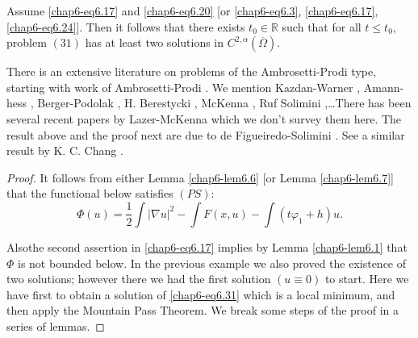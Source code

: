 \begin{theorem}\label{chap6-thm6.10}
Assume \eqref{chap6-eq6.17} and \eqref{chap6-eq6.20} [or
  \eqref{chap6-eq6.3}, \eqref{chap6-eq6.17},
  \eqref{chap6-eq6.24}]. Then it follows that there exists $t_{0}\in
\mathbb{R}$ such that for all $t\leq t_{0}$, problem $(31)$ has at
least two solutions in $C^{2,\alpha}(\overline{\Omega})$. 
\end{theorem}

\begin{remark*}
There is an extensive literature on problems of the Ambrosetti-Prodi
type, starting with work of Ambrosetti-Prodi \cite{key3}. We mention
Kazdan-Warner \cite{key52}, Amann-hess \cite{key1}, Berger-Podolak
\cite{key11}, H. Berestycki \cite{key9}, McKenna \cite{key57}, Ruf
\cite{key71} Solimini \cite{key76},\ldots There has been several
recent papers by Lazer-McKenna which we don't
survey them here. The result above and the proof next are due to de
Figueiredo-Solimini \cite{key43}. See a similar result by K.\@
C. Chang \cite{key25}.  
\end{remark*}

\begin{proof}
It follows from either Lemma \ref{chap6-lem6.6} [or Lemma
  \ref{chap6-lem6.7}] that the functional below satisfies $(PS)$: 
\begin{equation*}
\Phi(u)=\frac{1}{2}\int |\nabla u|^{2}-\int
F(x,u)-\int(t\varphi_{1}+h)u.\tag{6.32}\label{chap6-eq6.32} 
\end{equation*}

Also\pageoriginale the second assertion in \eqref{chap6-eq6.17}
implies by Lemma \ref{chap6-lem6.1} that $\Phi$ is not bounded
below. In the previous example we also proved the existence of two
solutions; however there we had the first solution $(u\equiv 0)$ to
start. Here we have first to obtain a solution of \eqref{chap6-eq6.31}
which is a local minimum, and then apply the Mountain Pass Theorem. We
break some steps of the proof in a series of lemmas.
\end{proof}

